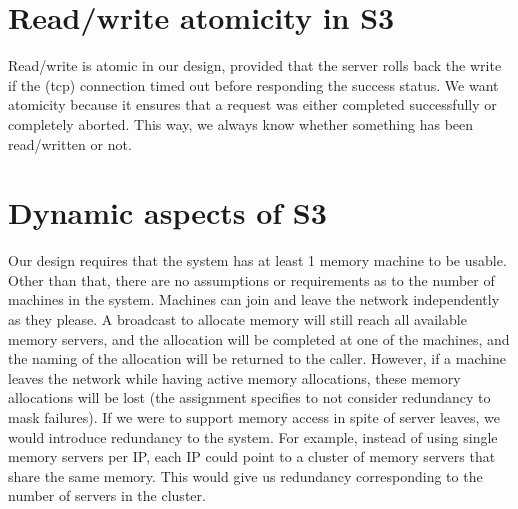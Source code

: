 \section{Read/write atomicity in S3}
Read/write is atomic in our design, provided that the server rolls back the write if the (tcp) connection timed out before responding the success status. We want atomicity because it ensures that a request was either completed successfully or completely aborted. This way, we always know whether something has been read/written or not.

\section{Dynamic aspects of S3}
Our design requires that the system has at least 1 memory machine to be usable. Other than that, there are no assumptions or requirements as to the number of machines in the system. Machines can join and leave the network independently as they please. A broadcast to allocate memory will still reach all available memory servers, and the allocation will be completed at one of the machines, and the naming of the allocation will be returned to the caller. However, if a machine leaves the network while having active memory allocations, these memory allocations will be lost (the assignment specifies to not consider redundancy to mask failures). If we were to support memory access in spite of server leaves, we would introduce redundancy to the system. For example, instead of using single memory servers per IP, each IP could point to a cluster of memory servers that share the same memory. This would give us redundancy corresponding to the number of servers in the cluster.


